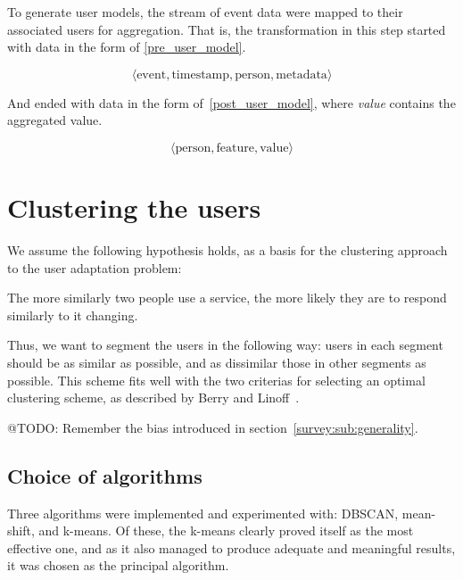 To generate user models, the stream of event data were mapped to their associated users for aggregation. That is, the transformation in this step started with data in the form of \eqref{pre_user_model}.

\begin{equation}
  \langle \text{event}, \text{timestamp}, \text{person}, \text{metadata} \rangle
  \label{pre_user_model}
\end{equation}

And ended with data in the form of~\eqref{post_user_model}, where \emph{value} contains the aggregated value.

\begin{equation}
  \langle \text{person}, \text{feature}, \text{value} \rangle
  \label{post_user_model}
\end{equation}

\section{Clustering the users}
\label{approach:clustering}

We assume the following hypothesis holds, as a basis for the clustering approach to the user adaptation problem:

\begin{hypothesis}
The more similarly two people use a service, the more likely they are to respond similarly to it changing.
\end{hypothesis}

Thus, we want to segment the users in the following way: users in each segment should be as similar as possible, and as dissimilar those in other segments as possible. This scheme fits well with the two criterias for selecting an optimal clustering scheme, as described by Berry and Linoff~\cite{Berry1997}.

@TODO: Remember the bias introduced in section~\ref{survey:sub:generality}.

\subsection{Choice of algorithms}
\label{approach:sec:clustering_algorithms}

Three algorithms were implemented and experimented with: DBSCAN, mean-shift, and k-means. Of these, the k-means clearly proved itself as the most effective one, and as it also managed to produce adequate and meaningful results, it was chosen as the principal algorithm.

